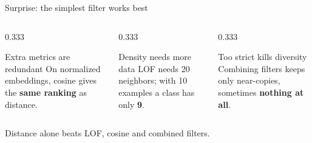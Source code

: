 \begin{frame}{Surprise: the simplest filter works best}
\vspace{0.4em}
\begin{columns}[T]
\begin{column}{0.333\textwidth}
\begin{mechbox}[colframe=uaiblue, colbacktitle=uaiblue, fontupper=\small\raggedright]{Extra metrics are redundant}
On normalized embeddings, cosine gives the \textbf{same ranking} as distance.
\end{mechbox}
\end{column}
\begin{column}{0.333\textwidth}
\begin{mechbox}[colframe=uaiamber, colbacktitle=uaiamber, fontupper=\small\raggedright]{Density needs more data}
LOF needs 20 neighbors; with 10 examples a class has only \textbf{9}.
\end{mechbox}
\end{column}
\begin{column}{0.333\textwidth}
\begin{mechbox}[colframe=uaiorange, colbacktitle=uaiorange, fontupper=\small\raggedright]{Too strict kills diversity}
Combining filters keeps only near-copies, sometimes \textbf{nothing at all}.
\end{mechbox}
\end{column}
\end{columns}

\vspace{1.0em}
\centering
\large
Distance alone beats LOF, cosine and combined filters.

\end{frame}

